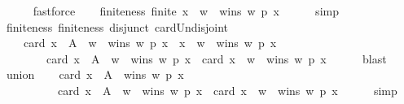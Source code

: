 \begin{isabellebody}
\ \ \ \ \isamarkupfalse%
\ fastforce\isanewline
\ \ \isamarkupfalse%
\ finiteness{}{\isacharcolon}{\kern0pt}\ {\isachardoublequoteopen}finite\ {\isacharbraceleft}{\kern0pt}x\ {\isasymin}\ {\isacharbraceleft}{\kern0pt}w{\isacharbraceright}{\kern0pt}\ {\isachardot}{\kern0pt}\ wins\ w\ p\ x{\isacharbraceright}{\kern0pt}{\isachardoublequoteclose}\isanewline
\ \ \ \ \isamarkupfalse%
\ simp\isanewline
\ \ \isamarkupfalse%
\ finiteness{}\ finiteness{}\ disjunct\ card{\isacharunderscore}{\kern0pt}Un{\isacharunderscore}{\kern0pt}disjoint\isanewline
\ \ \isamarkupfalse%
\isanewline
\ \ \ \ {\isachardoublequoteopen}card\ {\isacharparenleft}{\kern0pt}{\isacharbraceleft}{\kern0pt}x\ {\isasymin}\ A\ {\isacharminus}{\kern0pt}\ {\isacharbraceleft}{\kern0pt}w{\isacharbraceright}{\kern0pt}\ {\isachardot}{\kern0pt}\ wins\ w\ p\ x{\isacharbraceright}{\kern0pt}\ {\isasymunion}\ {\isacharbraceleft}{\kern0pt}x\ {\isasymin}\ {\isacharbraceleft}{\kern0pt}w{\isacharbraceright}{\kern0pt}\ {\isachardot}{\kern0pt}\ wins\ w\ p\ x{\isacharbraceright}{\kern0pt}{\isacharparenright}{\kern0pt}\ {\isacharequal}{\kern0pt}\isanewline
\ \ \ \ \ \ \ \ card\ {\isacharbraceleft}{\kern0pt}x\ {\isasymin}\ A\ {\isacharminus}{\kern0pt}\ {\isacharbraceleft}{\kern0pt}w{\isacharbraceright}{\kern0pt}\ {\isachardot}{\kern0pt}\ wins\ w\ p\ x{\isacharbraceright}{\kern0pt}\ {\isacharplus}{\kern0pt}\ card\ {\isacharbraceleft}{\kern0pt}x\ {\isasymin}\ {\isacharbraceleft}{\kern0pt}w{\isacharbraceright}{\kern0pt}\ {\isachardot}{\kern0pt}\ wins\ w\ p\ x{\isacharbraceright}{\kern0pt}{\isachardoublequoteclose}\isanewline
\ \ \ \ \isamarkupfalse%
\ blast\isanewline
\ \ \isamarkupfalse%
\ union\isanewline
\ \ \isamarkupfalse%
\ {\isachardoublequoteopen}card\ {\isacharbraceleft}{\kern0pt}x\ {\isasymin}\ A\ {\isachardot}{\kern0pt}\ wins\ w\ p\ x{\isacharbraceright}{\kern0pt}\ {\isacharequal}{\kern0pt}\isanewline
\ \ \ \ \ \ \ \ \ \ card\ {\isacharbraceleft}{\kern0pt}x\ {\isasymin}\ A\ {\isacharminus}{\kern0pt}\ {\isacharbraceleft}{\kern0pt}w{\isacharbraceright}{\kern0pt}\ {\isachardot}{\kern0pt}\ wins\ w\ p\ x{\isacharbraceright}{\kern0pt}\ {\isacharplus}{\kern0pt}\ card\ {\isacharbraceleft}{\kern0pt}x\ {\isasymin}\ {\isacharbraceleft}{\kern0pt}w{\isacharbraceright}{\kern0pt}\ {\isachardot}{\kern0pt}\ wins\ w\ p\ x{\isacharbraceright}{\kern0pt}{\isachardoublequoteclose}\isanewline
\ \ \ \ \isamarkupfalse%
\ simp\isanewline
\ \ \isamarkupfalse%

\end{isabellebody}
